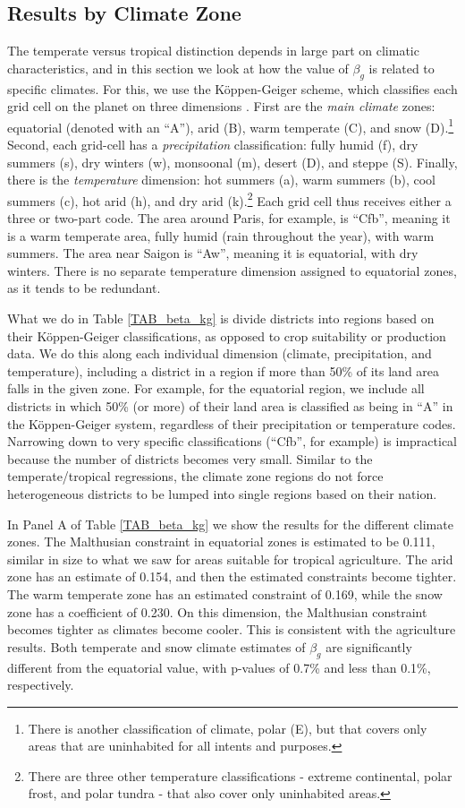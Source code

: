 \documentclass[11pt]{article}
\begin{document}
\subsection{Results by Climate Zone}
The temperate versus tropical distinction depends in large part on climatic characteristics, and in this section we look at how the value of $\beta_g$ is related to specific climates. For this, we use the K{\"o}ppen-Geiger scheme, which classifies each grid cell on the planet on three dimensions \citep{kottek2006}. First are the \textit{main climate} zones: equatorial (denoted with an ``A''), arid (B), warm temperate (C), and snow (D).\footnote{There is another classification of climate, polar (E), but that covers only areas that are uninhabited for all intents and purposes.} Second, each grid-cell has a \textit{precipitation} classification: fully humid (f), dry summers (s), dry winters (w), monsoonal (m), desert (D), and steppe (S). Finally, there is the \textit{temperature} dimension: hot summers (a), warm summers (b), cool summers (c), hot arid (h), and dry arid (k).\footnote{There are three other temperature classifications - extreme continental, polar frost, and polar tundra - that also cover only uninhabited areas.} Each grid cell thus receives either a three or two-part code. The area around Paris, for example, is ``Cfb'', meaning it is a warm temperate area, fully humid (rain throughout the year), with warm summers. The area near Saigon is ``Aw'', meaning it is equatorial, with dry winters. There is no separate temperature dimension assigned to equatorial zones, as it tends to be redundant.

What we do in Table \ref{TAB_beta_kg} is divide districts into regions based on their K{\"o}ppen-Geiger classifications, as opposed to crop suitability or production data. We do this along each individual dimension (climate, precipitation, and temperature), including a district in a region if more than 50\% of its land area falls in the given zone. For example, for the equatorial region, we include all districts in which 50\% (or more) of their land area is classified as being in ``A'' in the K{\"o}ppen-Geiger system, regardless of their precipitation or temperature codes. Narrowing down to very specific classifications (``Cfb'', for example) is impractical because the number of districts becomes very small. Similar to the temperate/tropical regressions, the climate zone regions do not force heterogeneous districts to be lumped into single regions based on their nation. 

In Panel A of Table \ref{TAB_beta_kg} we show the results for the different climate zones. The Malthusian constraint in equatorial zones is estimated to be 0.111, similar in size to what we saw for areas suitable for tropical agriculture. The arid zone has an estimate of 0.154, and then the estimated constraints become tighter. The warm temperate zone has an estimated constraint of 0.169, while the snow zone has a coefficient of 0.230. On this dimension, the Malthusian constraint becomes tighter as climates become cooler. This is consistent with the agriculture results. Both temperate and snow climate estimates of $\beta_g$ are significantly different from the equatorial value, with p-values of 0.7\% and less than 0.1\%, respectively.
\end{document}
